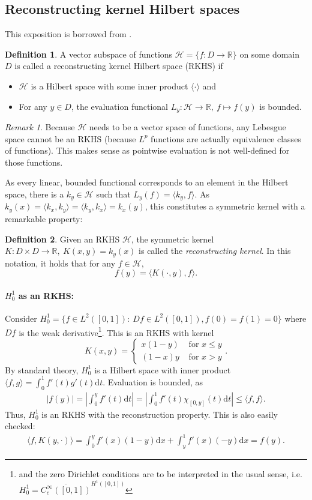 \documentclass{scrartcl}
\theoremstyle{definition}
\newtheorem{definition}{Definition}
\theoremstyle{remark}
\newtheorem{remark}{Remark}
\newcommand{\de}{\mathrm d}
\newcommand{\R}{\mathbb R}
\DeclareRobustCommand{\mybox}[2][gray!20]{%
\begin{tcolorbox}[   %
        breakable,
        left=0pt,
        right=0pt,
        top=0pt,
        bottom=0pt,
        colback=#1,
        colframe=#1,
        width=\dimexpr\textwidth\relax, 
        enlarge left by=0mm,
        boxsep=5pt,
        arc=0pt,outer arc=0pt,
        ]
        #2
\end{tcolorbox}
}
\begin{document}
\mybox{\subsection*{Reconstructing kernel Hilbert spaces}
This exposition is borrowed from \cite{paulsen2016introduction}. 
\begin{definition}
A vector subspace of functions $\mathcal H = \{f:D\to \R\}$  on some domain $D$ is called a reconstructing kernel Hilbert space (RKHS) if
\begin{itemize}
\item $\mathcal H$ is a Hilbert space with some inner product $\langle\cdot\rangle$ and
\item For any $y\in D$, the evaluation functional $L_y: \mathcal H \to \R,~ f\mapsto f(y)$ is bounded.
\end{itemize}
\end{definition}
\begin{remark}
Because $\mathcal H$ needs to be a vector space of functions, any Lebesgue space cannot be an RKHS (because $L^p$ functions are actually equivalence classes of functions). This makes sense as pointwise evaluation is not well-defined for those functions.
\end{remark}
As every linear, bounded functional corresponds to an element in the Hilbert space, there is a $k_y\in \mathcal H$ such that $L_y(f) = \langle k_y, f\rangle$. As $k_y(x) = \langle k_x, k_y\rangle = \langle k_y, k_x\rangle = k_x(y)$, this constitutes a  symmetric kernel with a remarkable property:
\begin{definition}
Given an RKHS $\mathcal H$, the symmetric kernel $K:D\times D\to\R,~ K(x,y) = k_y(x)$ is called the \textit{reconstructing kernel}. In this notation, it holds that for any $f\in \mathcal H$,
\[ f(y) = \langle K(\cdot, y), f\rangle. \]
\end{definition}
\paragraph{$H_0^1$ as an RKHS:}
Consider $H_0^1 = \{f\in L^2([0,1]): ~ Df\in L^2([0,1]), f(0)=f(1)=0\}$ where $Df$ is the weak derivative\footnote{and the zero Dirichlet conditions are to be interpreted in the usual sense, i.e. $H_0^1=\overline{C_c^\infty( [0,1])}^{H^1([0,1])}$ }. This is an RKHS with kernel 
\[K(x,y) = \begin{cases}x(1-y) & \text{ for } x\leq y\\(1-x)y & \text{ for } x > y\end{cases}.\]
By standard theory, $H_0^1$ is a Hilbert space with inner product $\langle f, g\rangle = \int_0^1 f'(t)g'(t)\de t$. Evaluation is bounded, as
\begin{align*}
|f(y)| = \left|\int_0^y f'(t) \de t\right| = \left|\int_0^1 f'(t) \chi_{[0,y]}(t)\de t\right| \leq \langle f,f\rangle.
\end{align*}
Thus, $H_0^1$ is an RKHS with the reconstruction property. This is also easily checked:
\begin{align*}
\langle f, K(y, \cdot)\rangle = \int_0^y f'(x) (1-y)\de x + \int_y^1 f'(x) (-y)\de x = f(y).
\end{align*}
}
\end{document}
